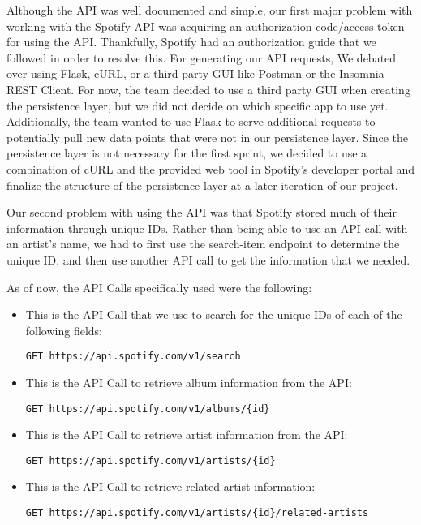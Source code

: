 \documentclass{scrartcl}
\begin{document}
Although the API was well documented and simple, our first major problem with working with the Spotify API was acquiring an authorization code/access token for using the API. Thankfully, Spotify had an authorization guide that we followed in order to resolve this. For generating our API requests, We debated over using Flask, cURL, or a third party GUI like Postman or the Insomnia REST Client. For now, the team decided to use a third party GUI when creating the persistence layer, but we did not decide on which specific app to use yet. Additionally, the team wanted to use Flask to serve additional requests to potentially pull new data points that were not in our persistence layer. Since the persistence layer is not necessary for the first sprint, we decided to use a combination of cURL and the provided web tool in Spotify’s developer portal and finalize the structure of the persistence layer at a later iteration of our project. 

Our second problem with using the API was that Spotify stored much of their information through unique IDs. Rather than being able to use an API call with an artist’s name, we had to first use the search-item endpoint to determine the unique ID, and then use another API call to get the information that we needed.

As of now, the API Calls specifically used were the following:

\begin{itemize}
    \item This is the API Call that we use to search for the unique IDs of each of the following fields:
    \begin{verbatim}GET https://api.spotify.com/v1/search\end{verbatim}

    \item This is the API Call to retrieve album information from the API:
    \begin{verbatim}GET https://api.spotify.com/v1/albums/{id}\end{verbatim}

    \item This is the API Call to retrieve artist information from the API:
    \begin{verbatim}GET https://api.spotify.com/v1/artists/{id}\end{verbatim}

    \item This is the API Call to retrieve related artist information:
    \begin{verbatim}GET https://api.spotify.com/v1/artists/{id}/related-artists\end{verbatim}
\end{itemize}
\end{document}
